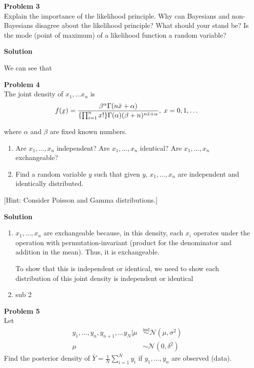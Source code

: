 \documentclass{article}
\newcommand{\ut}[1]{\underaccent{\tilde}{#1}}
\renewcommand{\vec}[1]{\ut{#1}}
\newcommand{\ind}{\stackrel{\text{ind}}{\sim}}
\newcommand{\nx}{x_1,\dots,x_n}
\newcommand{\ny}{y_1,\dots,y_n}
\begin{document}
\newpage
\noindent
\Large{\textbf{Problem 3}}\normalsize
\\

Explain the importance of the likelihood principle. Why can Bayesians and
non-Bayesians disagree about the likelihood principle? What should your stand be? Is the mode (point of maximum) of a likelihood function a random variable?

\vspace{\baselineskip}
\noindent
\textbf{Solution}

We can see that 

\vspace{\baselineskip}
\noindent
\Large{\textbf{Problem 4}}\normalsize
\\

The joint density of $x_1,\dots x_n$ is
\[f(\vec{x}) = \frac{\beta^{\alpha}\Gamma(n\bar{x} + \alpha)}{\{\prod_{i=1}^n x!\}\Gamma(\alpha)(\beta + n)^{n\bar{x} + \alpha}}, \; x = 0,1,\dots\]

where $\alpha$ and $\beta$ are fixed known numbers.
\begin{enumerate}
    \item Are $\nx$ independent? Are $\nx$ identical? Are $\nx$ exchangeable?
    \item Find a random variable $y$ such that given $y$, $\nx$ are independent and identically distributed.
\end{enumerate}

[Hint: Consider Poisson and Gamma distributions.]

\vspace{\baselineskip}
\noindent
\textbf{Solution}

\begin{enumerate}
    \item $\nx$ are exchangeable because, in this density, each $x_i$ operates under the operation with permutation-invariant (product for the denominator and addition in the mean). Thus, it is exchangeable.

    To show that this is independent or identical, we need to show each distribution of this joint density is independent or identical
    \item sub 2
\end{enumerate}

\vspace{\baselineskip}
\noindent
\Large{\textbf{Problem 5}}\normalsize
\\

Let 
\begin{align*}
   \ny, y_{n+1}, \dots y_N | \mu & \ind\mathcal{N}(\mu,\sigma^2)\\
    \mu &\sim \mathcal{N}(0,\delta^2)
\end{align*}
Find the posterior density of $\bar{Y} = \frac{1}{N}\sum_{i=1}^N y_i$ if $\ny$ are observed (data).
\end{document}
